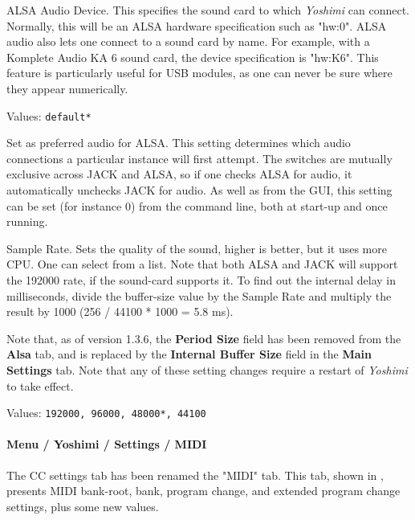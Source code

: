    ALSA Audio Device.
   This specifies the sound card to which \textsl{Yoshimi} can connect.
   Normally, this will be an ALSA hardware specification such as
   "hw:0".
   ALSA audio also lets one connect to a sound card by name. For example,
   with a Komplete Audio KA 6 sound card, the device specification is
   "hw:K6". This feature is particularly useful for USB modules, as one can
   never be sure where they appear numerically.

   Values: \texttt{default*}

   Set as preferred audio for ALSA.
   This setting determines which audio connections a particular instance will
   first attempt. The switches are mutually exclusive across JACK and ALSA,
   so if one checks ALSA for audio, it automatically unchecks JACK for audio.
   As well as from the GUI, this setting can be set (for instance 0) from the
   command line, both at start-up and once running.

   Sample Rate.
   Sets the quality of the sound, higher is better, but it uses more CPU.  One
   can select from a list.  Note that both ALSA and JACK will support the
   192000 rate, if the sound-card supports it.  To find out the internal delay
   in milliseconds, divide the buffer-size value by the Sample Rate and
   multiply the result by 1000 (256 / 44100 * 1000 = 5.8 ms).

   Note that, as of version 1.3.6, the \textbf{Period Size} field has been
   removed from the \textbf{Alsa} tab, and is replaced by the 
   \textbf{Internal Buffer Size} field in the \textbf{Main Settings} tab.
   Note that any of these setting changes require a restart of \textsl{Yoshimi}
   to take effect.
   

   Values: \texttt{192000, 96000, 48000*, 44100}

\paragraph{Menu / Yoshimi / Settings / MIDI}
\label{paragraph:menu_yoshimi_settings_ccs}

   The CC settings tab has been renamed the "MIDI" tab.
   This tab, shown in
   ,
   presents MIDI bank-root, bank, program change, and extended program
   change settings, plus some new values.

